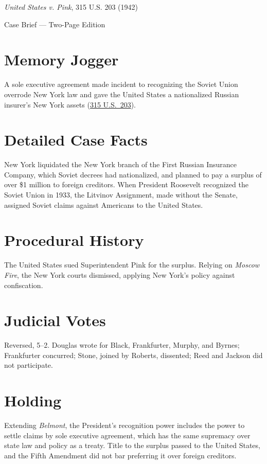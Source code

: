 \documentclass[12pt]{article}
\begin{document}
\begin{center}
{\LARGE \textit{United States v. Pink}, 315 U.S. 203 (1942)\par}
\vspace{0.5em}
{\large Case Brief --- Two-Page Edition\par}
\end{center}

\section{Memory Jogger}
A sole executive agreement made incident to recognizing the Soviet Union overrode New York law and gave the United States a nationalized Russian insurer's New York assets (\href{https://supreme.justia.com/cases/federal/us/315/203/}{315 U.S.\ 203}).

\section{Detailed Case Facts}
New York liquidated the New York branch of the First Russian Insurance Company, which Soviet decrees had nationalized, and planned to pay a surplus of over \$1 million to foreign creditors. When President Roosevelt recognized the Soviet Union in 1933, the Litvinov Assignment, made without the Senate, assigned Soviet claims against Americans to the United States.

\section{Procedural History}
The United States sued Superintendent Pink for the surplus. Relying on \textit{Moscow Fire}, the New York courts dismissed, applying New York's policy against confiscation.

\section{Judicial Votes}
Reversed, 5--2. Douglas wrote for Black, Frankfurter, Murphy, and Byrnes; Frankfurter concurred; Stone, joined by Roberts, dissented; Reed and Jackson did not participate.

\section{Holding}
Extending \textit{Belmont}, the President's recognition power includes the power to settle claims by sole executive agreement, which has the same supremacy over state law and policy as a treaty. Title to the surplus passed to the United States, and the Fifth Amendment did not bar preferring it over foreign creditors.
\end{document}
